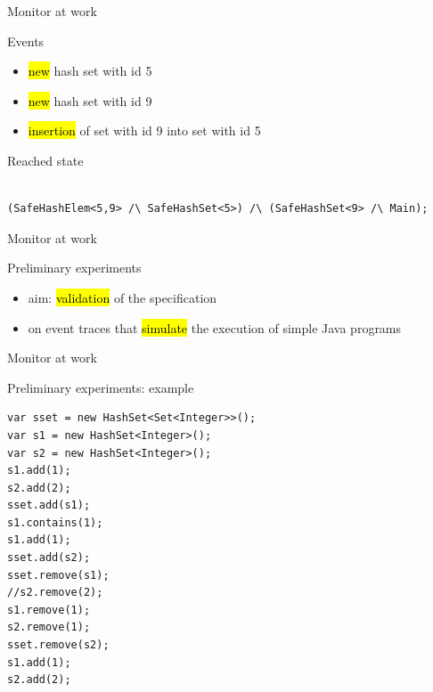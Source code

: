 \documentclass[10pt,usenames,dvipsnames]{beamer}
\begin{document}
\begin{frame}[fragile]{Monitor at work}
  \begin{block}{Events}
    \begin{itemize}
    \item  \hl{new} hash set with id 5
    \item  \hl{new} hash set with id 9
    \item \hl{insertion} of set with id 9 into set with id 5  
    \end{itemize}
  \end{block}

  \begin{block}{Reached state}
    \begin{lstlisting}[basicstyle=\ttfamily\footnotesize]

(SafeHashElem<5,9> /\ SafeHashSet<5>) /\ (SafeHashSet<9> /\ Main);

    \end{lstlisting}
  \end{block}
\end{frame}


\begin{frame}[fragile]{Monitor at work}
  \begin{block}{Preliminary experiments}
    \begin{itemize}
    \item  aim: \hl{validation} of the specification 
    \item  on event traces that \hl{simulate} the  execution of simple Java programs
    \end{itemize}
  \end{block}
\end{frame}


\begin{frame}[fragile]{Monitor at work}
  \begin{block}{Preliminary experiments: example}
    \begin{lstlisting}[basicstyle=\ttfamily\footnotesize,morekeywords={new}]
var sset = new HashSet<Set<Integer>>();
var s1 = new HashSet<Integer>();
var s2 = new HashSet<Integer>();
s1.add(1);
s2.add(2);
sset.add(s1);
s1.contains(1);
s1.add(1);
sset.add(s2);
sset.remove(s1);
//s2.remove(2);
s1.remove(1);
s2.remove(1);
sset.remove(s2);
s1.add(1);
s2.add(2);
    \end{lstlisting}
  \end{block}
\end{frame}
\end{document}
